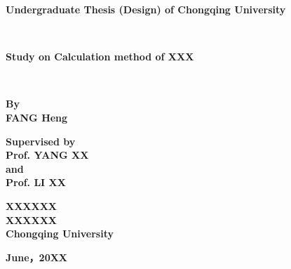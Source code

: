 \newpage
\thispagestyle{empty}
\setmainfont{Times New Roman}
\begin{center}
\textbf{
Undergraduate Thesis (Design) of Chongqing University}
\end{center}
~\\
\begin{center}
\textbf{
Study on Calculation method of XXX }
\end{center}

~\\
\renewcommand{\headrulewidth}{1pt}
\begin{figure}[htb] 
  \centering
     \end{figure}
     

\setmainfont{Times New Roman}
\begin{center}
\textbf{By}  \\
\textbf{FANG Heng }
\end{center}

\begin{center}
\textbf{Supervised by}\\
\textbf{Prof. YANG XX}\\
\textbf{and}\\
\textbf{Prof. LI XX}
\end{center}

\begin{center}
\textbf{XXXXXX}\\ %
\textbf{XXXXXX}\\ %
\textbf{Chongqing University}
\end{center}

\begin{center}
\textbf{June，20XX}
\end{center}